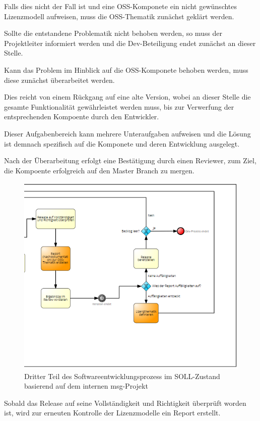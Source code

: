 Falls dies nicht der Fall ist und eine OSS-Komponete ein nicht gewünschtes Lizenzmodell aufweisen, muss die OSS-Thematik zunächst geklärt werden.

Sollte die entstandene Problematik nicht behoben werden, so muss der Projektleiter informiert werden und die Dev-Beteiligung endet zunächst an dieser Stelle. 

Kann das Problem im Hinblick auf die OSS-Komponete behoben werden, muss diese zunächst überarbeitet werden. 

Dies reicht von einem Rückgang auf eine alte Version, wobei an dieser Stelle die gesamte Funktionalität gewährleistet werden muss, bis zur Verwerfung der entsprechenden Kompoente durch den Entwickler. 

Dieser Aufgabenbereich kann mehrere Unteraufgaben aufweisen und die Lösung ist demnach spezifisch auf die Komponete und deren Entwicklung ausgelegt. 

Nach der Überarbeitung erfolgt eine Bestätigung durch einen Reviewer, zum Ziel, die Kompoente erfolgreich auf den Master Branch zu mergen. 

\begin{figure}[h]
    \centering
    \includegraphics[scale=0.5]{Bilder/SOLL-Prozess_third Part.png}
    \caption{Dritter Teil des Softwareentwicklungsprozess im SOLL-Zustand basierend auf dem internen msg-Projekt}
\end{figure}

Sobald das Release auf seine Vollständigkeit und Richtigkeit überprüft worden ist, wird zur erneuten Kontrolle der Lizenzmodelle ein Report erstellt. 

